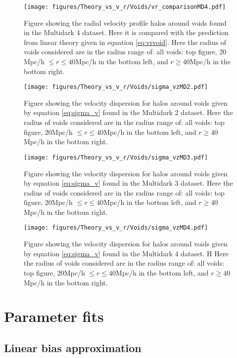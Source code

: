\begin{figure}[htbp]\label{fig:vrMD4}
    \texttt{[image: figures/Theory\_vs\_v\_r/Voids/vr\_comparisonMD4.pdf]}
    \caption{Figure showing the radial velocity profile halos around voids found in the Multidark 4 dataset. Here it is compared with the prediction from linear theory given in equation \ref{eq:vrvoid}. Here the radius of voids considered are in the radius range of: all voids: top figure, $20$Mpc/h $\leq r\leq 40$Mpc/h in the bottom left, and $r\geq 40$Mpc/h in the bottom right.}
\end{figure}

\begin{figure}[htbp]\label{fig:sigmavMD2}
    \texttt{[image: figures/Theory\_vs\_v\_r/Voids/sigma\_vzMD2.pdf]}
    \caption{Figure showing the velocity dispersion for halos around voids given by equation \ref{eq:sigma_v} found in the Multidark 2 dataset. Here the radius of voids considered are in the radius range of: all voids: top figure, $20$Mpc/h $\leq r\leq 40$Mpc/h in the bottom left, and $r\geq 40$Mpc/h in the bottom right.}
\end{figure}

\begin{figure}[htbp]\label{fig:sigmavMD3}
    \texttt{[image: figures/Theory\_vs\_v\_r/Voids/sigma\_vzMD3.pdf]}
    \caption{Figure showing the velocity dispersion for halos around voids given by equation \ref{eq:sigma_v} found in the Multidark 3 dataset. Here the radius of voids considered are in the radius range of: all voids: top figure, $20$Mpc/h $\leq r\leq 40$Mpc/h in the bottom left, and $r\geq 40$Mpc/h in the bottom right.}
\end{figure}

\begin{figure}[htbp]\label{fig:sigmavMD4}
    \texttt{[image: figures/Theory\_vs\_v\_r/Voids/sigma\_vzMD4.pdf]}
    \caption{Figure showing the velocity dispersion for halos around voids given by equation \ref{eq:sigma_v} found in the Multidark 4 dataset. H Here the radius of voids considered are in the radius range of: all voids: top figure, $20$Mpc/h $\leq r\leq 40$Mpc/h in the bottom left, and $r\geq 40$Mpc/h in the bottom right.}
\end{figure}
\section{Parameter fits}
\subsection{Linear bias approximation}

